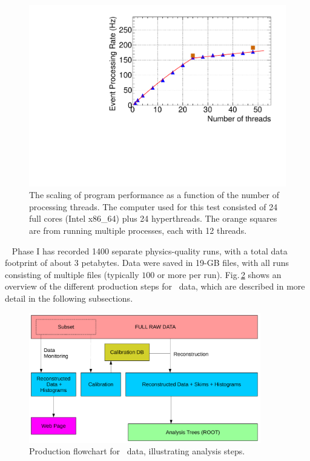 \begin{figure}[h!]\centering
\includegraphics[width=1.0\textwidth]{figures/rate_vs_nthread.pdf}
\caption[]{\label{fig:offline_monitorA}The scaling of program performance as a function of the number of processing threads. The computer used for this test consisted of 24 full cores (Intel x86\_64) plus 24 hyperthreads. The orange squares are from running multiple processes, each with 12 threads.} 
\end{figure}

\GX~ Phase I has recorded 1400 separate physics-quality runs, with a total data footprint of about 3 petabytes. Data were saved in 19-GB files, with all runs consisting of multiple files (typically $100$ or more per run). Fig.\,\ref{fig:production_overview} shows an overview of the different production steps for \GX~data, which are described in more detail in the following subsections.

\begin{figure}[hbt]\centering
\includegraphics[width=0.9\textwidth]{figures/production_overview_calib_v2.pdf}
\caption[]{\label{fig:production_overview}Production flowchart for \GX~data, illustrating analysis steps.} 
\end{figure}

